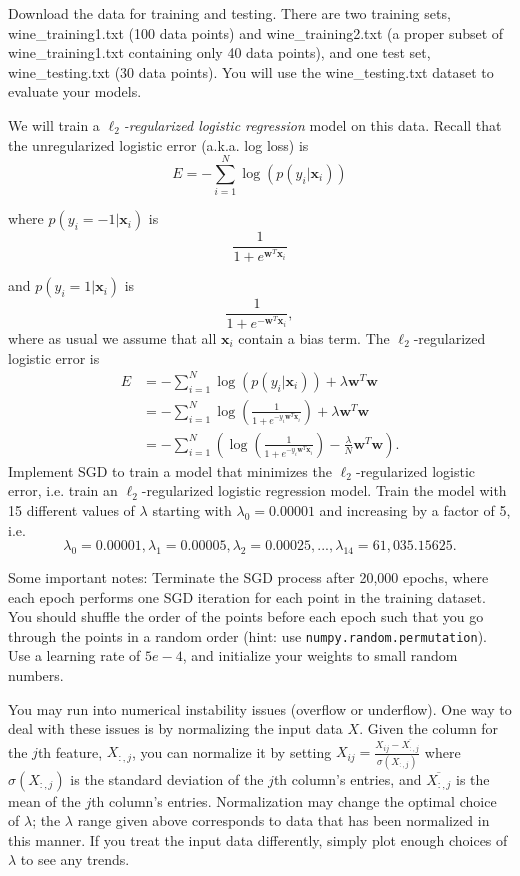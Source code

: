 Download the data for training and testing.
There are two training sets, wine\_training1.txt (100 data points) and wine\_training2.txt (a proper subset of wine\_training1.txt containing only 40 data points), and one test set, wine\_testing.txt (30 data points). You will use the wine\_testing.txt dataset to evaluate your models.

We will train a \emph{$\ell_2$-regularized logistic regression} model on this data. Recall that the unregularized logistic error (a.k.a. log loss) is
\[E = -\sum_{i=1}^{N}\log(p(y_i | \mathbf{x}_i))\]

where $p(y_i = -1 | \mathbf{x}_i)$ is
\[\frac{1}{1 + e^{\mathbf{w}^T\mathbf{x}_i}}\]

and $p(y_i = 1 | \mathbf{x}_i)$ is
\[\frac{1}{1 + e^{-\mathbf{w}^T\mathbf{x}_i}},\]
where as usual we assume that all $\mathbf{x}_i$ contain a bias term.
The $\ell_2$-regularized logistic error is
\begin{align*}
  E &= -\sum_{i=1}^{N}\log(p(y_i | \mathbf{x}_i)) + \lambda\mathbf{w}^T\mathbf{w} \\
    &= -\sum_{i=1}^{N} \log \left( \frac{1}{1 + e^{-y_i\mathbf{w}^T\mathbf{x}_i}} \right) + \lambda\mathbf{w}^T\mathbf{w} \\
    &= -\sum_{i=1}^{N} \left(\log \left( \frac{1}{1 + e^{-y_i\mathbf{w}^T\mathbf{x}_i}} \right) - \frac{\lambda}{N}\mathbf{w}^T\mathbf{w}\right).
\end{align*}
Implement SGD to train a model that minimizes the $\ell_2$-regularized logistic error, i.e. train an $\ell_2$-regularized logistic regression model.  Train the model with 15 different values of $\lambda$ starting with $\lambda_0 = 0.00001$ and increasing by a factor of 5, i.e. $$\lambda_0 = 0.00001, \lambda_1 = 0.00005, \lambda_2 = 0.00025, ..., \lambda_{14} = 61,035.15625.$$
\par

Some important notes: Terminate the SGD process after 20,000 epochs, where each epoch performs one SGD iteration for each point in the training dataset. You should shuffle the order of the points before each epoch such that you go through the points in a random order (hint: use \texttt{numpy.random.permutation}). Use a learning rate of $5e-4$, and initialize your weights to small random numbers.

You may run into numerical instability issues (overflow or underflow). One way to deal with these issues is by normalizing the input data $X$. Given the column for the $j$th feature, $X_{:,j}$, you can normalize it by setting $X_{ij} = \frac{X_{ij} - \overline{X_{:,j}} }{\sigma(X_{:,j})}$ where $\sigma(X_{:,j})$ is the standard deviation of the $j$th column's entries, and $\overline{X_{:,j}}$ is the mean of the $j$th column's entries. Normalization may change the optimal choice of $\lambda$; the $\lambda$ range given above corresponds to data that has been normalized in this manner. If you treat the input data differently, simply plot enough choices of $\lambda$ to see any trends.


